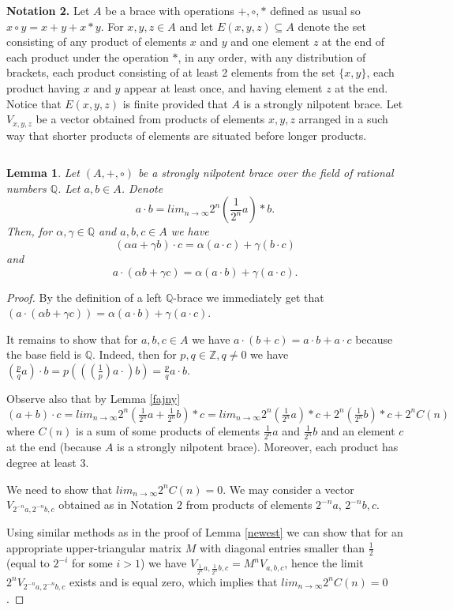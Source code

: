 \documentclass[12pt]{article}
\newtheorem{lemma}[theorem]{Lemma}
\begin{document}
{\bf Notation 2.} Let $A$ be a brace with operations $+, \circ , *$ defined as usual so $x\circ y=x+y+x*y$.
  For $x, y, z\in A$  and 
let $E(x, y, z)\subseteq A$ denote the set consisting of any product of elements $x$ and $y$ and one element $z$ at the end of each product under the operation $*$,  in any order, with any distribution of brackets, each product consisting of at least 2 elements from the set $\{x,y\}$, each product having $x$ and $y$ appear at least once,  and having element $z$ at the end. Notice that $E(x,y,z )$ is  finite provided that $A$ is a strongly nilpotent brace. Let $V_{x,y,z}$ be  a vector obtained from products of elements $x, y, z$ arranged in a such way that shorter products of elements  are situated  before longer products.

$ $

\begin{lemma}\label{sund}
 Let $(A, +, \circ )$ be a  strongly  nilpotent  brace over the field of rational numbers $\mathbb Q$. Let  $a,b\in A$. Denote 
\[a\cdot b=lim _{n\rightarrow \infty }2^{n}({\frac 1{2^{n}}} a)*b.\]
 Then, for  $\alpha, \gamma  \in \mathbb Q$ and $a, b,c\in A$ we have
\[(\alpha a +\gamma b)\cdot c=\alpha (a\cdot c)+ \gamma (b\cdot c)\]
and 
\[a\cdot (\alpha b+\gamma c)=\alpha (a\cdot b)+ \gamma (a\cdot c).\]
\end{lemma}
\begin{proof} 
By the definition of a left $\mathbb Q$-brace we immediately get that  $(a\cdot (\alpha b+ \gamma c))=\alpha (a\cdot b)+ \gamma (a\cdot c)$. 

 It remains to show that  for $a, b,c\in A$ we have $a\cdot (b+c)=a\cdot b+a\cdot c$  because the base field is $\mathbb Q$. Indeed,  then for $p,q\in \mathbb Z, q\neq 0$ we have 
$ ({\frac pq} a)\cdot b=p((({\frac 1p})a\cdot) b)={\frac pq}a\cdot b$.
 

 Observe also that by Lemma \ref{fajny} $(a+b)\cdot c=lim _{n\rightarrow \infty }
2^{n}  ({\frac 1{2^{n}}} a+{\frac 1{2^{n}}}b)* c=
lim _{n\rightarrow \infty }{{2^{n}}}({\frac 1{2^{n}}} a)* c+2^{n}({\frac 1{2^{n}}}b)*c+2^{n}C(n)$ 
 where $C(n)$ is a sum of some products of elements ${\frac 1{2^{n}}}a$ and ${\frac 1{2^{n}}}b$ and an element $c$ at the end
(because $A$ is a strongly nilpotent brace). Moreover, each product has degree at least $3$.
 

We need to show that $lim _{n\rightarrow \infty }2^{n}C(n)=0$.
  We may consider a vector $V_{2^{-n}a, 2^{-n}b, c}$ obtained as in Notation $2$ from products of elements $2^{-n}a$, $2^{-n}b, c$. 

 Using similar methods as in the proof of Lemma \ref{newest} we can show that for an appropriate upper-triangular matrix $M$
 with diagonal entries smaller than $\frac 12$ (equal to $2^{-i}$ for some $i>1$) we have 
$V_{{\frac 1{2^{n}}}a, {\frac 1{2^{n}}}b, c}=M^{n}V_{a,b, c}$, hence the limit $2^{n}V_{2^{-n}a, 2^{-n}b,c}$ exists and is equal zero, which implies that 
$lim _{n\rightarrow \infty }2^{n}C(n)=0$.
\end{proof} 
\end{document}
